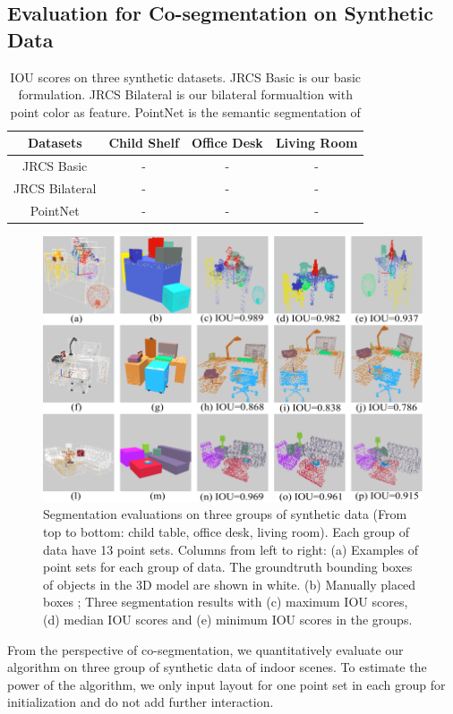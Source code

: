 \subsection{Evaluation for Co-segmentation on Synthetic Data}
\begin{table}
	\centering
	\caption{IOU scores on three synthetic datasets. JRCS Basic is our basic formulation. JRCS Bilateral  is our bilateral formualtion with point color as feature. PointNet is the semantic segmentation of \cite{qi2016pointnet} }
	\begin{tabular}{c c c c}
		Datasets & Child Shelf & Office Desk  & Living Room  \\
		\hline
		JRCS Basic & - & - & -\\   
		JRCS Bilateral & - & - & -\\
		PointNet & - & - & -\\
	\end{tabular}
	\label{tab:seg}
\end{table}
\begin{figure}[htb]
	\centering
	\includegraphics[width=0.8\linewidth]{images/seg/seg}
	\caption{\label{fig:seg} Segmentation evaluations on three groups of synthetic data (From top to bottom: child table, office desk, living room). Each group of data have 13 point sets. Columns from left to right: (a) Examples of point sets for each group of data. The groundtruth bounding boxes of objects in the 3D model are shown in white. (b) Manually placed boxes ; Three segmentation results with (c) maximum IOU scores, (d) median IOU scores and (e) minimum IOU scores in the groups.}
\end{figure}
From the perspective of co-segmentation, we quantitatively evaluate our algorithm on three group of synthetic data of indoor scenes. 
%
To estimate the power of the algorithm, we only input layout for one point set in each group for initialization and do not add further interaction.
